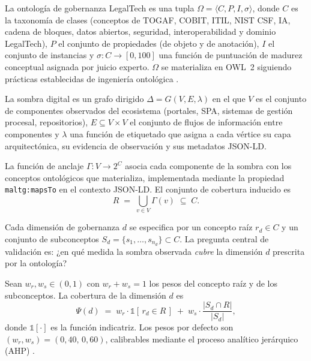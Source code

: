 \documentclass[computers,article,submit,pdftex,moreauthors]{Definitions/mdpi}
\begin{document}
\begin{Definition}
La ontología de gobernanza LegalTech es una tupla $\Omega = \langle C, P, I, \sigma \rangle$, donde $C$ es la taxonomía de clases (conceptos de TOGAF, COBIT, ITIL, NIST CSF, IA, cadena de bloques, datos abiertos, seguridad, interoperabilidad y dominio LegalTech), $P$ el conjunto de propiedades (de objeto y de anotación), $I$ el conjunto de instancias y $\sigma: C \rightarrow [0,100]$ una función de puntuación de madurez conceptual asignada por juicio experto. $\Omega$ se materializa en OWL~2 siguiendo prácticas establecidas de ingeniería ontológica \cite{Gruber1993,Uschold1996,Guarino2002}.
\end{Definition}

\begin{Definition}
La sombra digital es un grafo dirigido $\Delta = G(V, E, \lambda)$ en el que $V$ es el conjunto de componentes observados del ecosistema (portales, SPA, sistemas de gestión procesal, repositorios), $E \subseteq V \times V$ el conjunto de flujos de información entre componentes y $\lambda$ una función de etiquetado que asigna a cada vértice su capa arquitectónica, su evidencia de observación y sus metadatos JSON-LD.
\end{Definition}

\begin{Definition}
La función de anclaje $\Gamma: V \rightarrow 2^{C}$ asocia cada componente de la sombra con los conceptos ontológicos que materializa, implementada mediante la propiedad \texttt{maltg:mapsTo} en el contexto JSON-LD. El conjunto de cobertura inducido es
\begin{equation}
R \;=\; \bigcup_{v \in V} \Gamma(v) \;\subseteq\; C .
\label{eq:coverage-set}
\end{equation}
\end{Definition}

Cada dimensión de gobernanza $d$ se especifica por un concepto raíz $r_d \in C$ y un conjunto de subconceptos $S_d = \{s_1, \dots, s_{n_d}\} \subset C$. La pregunta central de validación es: ¿en qué medida la sombra observada \emph{cubre} la dimensión $d$ prescrita por la ontología?

\begin{Definition}
Sean $w_r, w_s \in (0,1)$ con $w_r + w_s = 1$ los pesos del concepto raíz y de los subconceptos. La cobertura de la dimensión $d$ es
\begin{equation}
\Psi(d) \;=\; w_r \cdot \mathbb{1}\!\left[\, r_d \in R \,\right] \;+\; w_s \cdot \frac{\lvert S_d \cap R \rvert}{\lvert S_d \rvert},
\label{eq:psi}
\end{equation}
donde $\mathbb{1}[\cdot]$ es la función indicatriz. Los pesos por defecto son $(w_r, w_s) = (0{,}40,\, 0{,}60)$, calibrables mediante el proceso analítico jerárquico (AHP) \cite{Saaty1990}.
\end{Definition}
\end{document}
